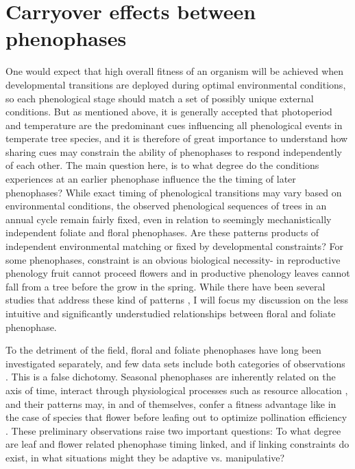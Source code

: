 \documentclass{article}\usepackage[]{graphicx}\usepackage[]{color}
\begin{document}
\section{Carryover effects between phenophases}
One would expect that high overall fitness of an organism will be achieved when developmental transitions are deployed during optimal environmental conditions, so each phenological stage should match a set of possibly unique external conditions. But as mentioned above, it is generally accepted that photoperiod and temperature are the predominant cues influencing all phenological events in temperate tree species, and it is therefore of great importance to understand how sharing cues may constrain the ability of phenophases to respond independently of each other. The main question here, is to what degree do the conditions experiences at an earlier phenophase influence the the timing of later phenophases? While exact timing of phenological transitions may vary based on environmental conditions, the observed phenological sequences of trees in an annual cycle remain fairly fixed, even in relation to seemingly mechanistically independent foliate and floral phenophases. Are these patterns products of independent environmental matching or fixed by developmental constraints? For some phenophases, constraint is an obvious biological necessity- in reproductive phenology fruit cannot proceed flowers and in productive phenology leaves cannot fall from a tree before the grow in the spring. While there have been several studies that address these kind of patterns \citep{Richardson something, Primack something}, I will focus my discussion on the less intuitive and significantly understudied relationships between floral and foliate phenophase.
\par To the detriment of the field, floral and foliate phenophases have long been investigated separately, and few data sets include both categories of observations \citep{Wolkovich and Ettinger}. This is a false dichotomy. Seasonal phenophases are inherently related on the axis of time, interact through physiological processes such as resource allocation \cite{}, and their patterns may, in and of themselves, confer a fitness advantage like in the case of species that flower before leafing out to optimize pollination efficiency \citep{}. These preliminary observations raise two important questions: To what degree are leaf and flower related phenophase timing linked, and if linking constraints do exist, in what situations might they be adaptive vs. manipulative?
\end{document}
